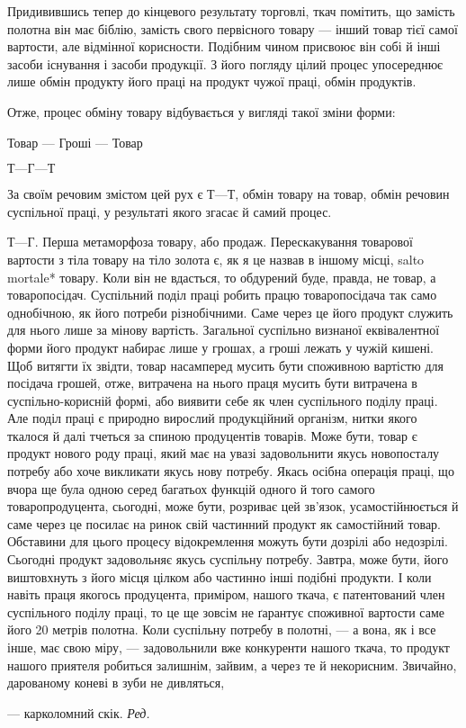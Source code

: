 Придивившись тепер до кінцевого результату торговлі, ткач
помітить, що замість полотна він має біблію, замість свого первісного
товару — інший товар тієї самої вартости, але відмінної
корисности. Подібним чином присвоює він собі й інші засоби
існування і засоби продукції. З його погляду цілий процес
упосереднює лише обмін продукту його праці на продукт чужої
праці, обмін продуктів.

Отже, процес обміну товару відбувається у вигляді такої зміни
форми:

Товар — Гроші — Товар

$Т — Г — Т$

За своїм речовим змістом цей рух є $Т — Т$, обмін товару на
товар, обмін речовин суспільної праці, у результаті якого згасає
й самий процес.

$Т — Г$. Перша метаморфоза товару, або продаж. Перескакування
товарової вартости з тіла товару на тіло золота є, як я
це назвав в іншому місці, salto mortale* товару. Коли він не
вдасться, то обдурений буде, правда, не товар, а товаропосідач.
Суспільний поділ праці робить працю товаропосідача так само
однобічною, як його потреби різнобічними. Саме через це його
продукт служить для нього лише за мінову вартість. Загальної
суспільно визнаної еквівалентної форми його продукт набирає
лише у грошах, а гроші лежать у чужій кишені. Щоб витягти
їх звідти, товар насамперед мусить бути споживною вартістю
для посідача грошей, отже, витрачена на нього праця мусить
бути витрачена в суспільно-корисній формі, або виявити себе
як член суспільного поділу праці. Але поділ праці є природно
вирослий продукційний організм, нитки якого ткалося й далі
тчеться за спиною продуцентів товарів. Може бути, товар є продукт
нового роду праці, який має на увазі задовольнити якусь
новопосталу потребу або хоче викликати якусь нову потребу.
Якась осібна операція праці, що вчора ще була одною серед
багатьох функцій одного й того самого товаропродуцента, сьогодні,
може бути, розриває цей зв’язок, усамостійнюється й
саме через це посилає на ринок свій частинний продукт як самостійний
товар. Обставини для цього процесу відокремлення можуть
бути дозрілі або недозрілі. Сьогодні продукт задовольняє
якусь суспільну потребу. Завтра, може бути, його виштовхнуть
з його місця цілком або частинно інші подібні продукти. І коли
навіть праця якогось продуцента, приміром, нашого ткача, є
патентований член суспільного поділу праці, то це ще зовсім
не ґарантує споживної вартости саме його 20 метрів полотна.
Коли суспільну потребу в полотні, — а вона, як і все інше, має
свою міру, — задовольнили вже конкуренти нашого ткача, то
продукт нашого приятеля робиться залишнім, зайвим, а через
те й некорисним. Звичайно, дарованому коневі в зуби не дивляться,

— карколомний скік. \emph{Ред.}
\parbreak{}  %
